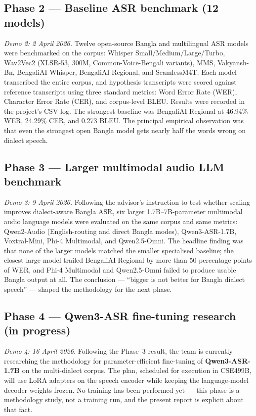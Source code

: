 \documentclass[12pt,a4paper]{article}
\begin{document}
\subsection*{Phase 2 --- Baseline ASR benchmark (12 models)}
\textit{Demo 2: 2 April 2026.}
Twelve open-source Bangla and multilingual ASR models were
benchmarked on the corpus: Whisper Small/Medium/Large/Turbo,
Wav2Vec2 (XLSR-53, 300M, Common-Voice-Bengali variants), MMS,
Vakyansh-Bn, BengaliAI Whisper, BengaliAI Regional, and
SeamlessM4T. Each model transcribed the entire corpus, and
hypothesis transcripts were scored against reference transcripts
using three standard metrics: Word Error Rate (WER), Character
Error Rate (CER), and corpus-level BLEU. Results were recorded in
the project's CSV log. The strongest baseline was BengaliAI
Regional at 46.94\% WER, 24.29\% CER, and 0.273 BLEU. The principal
empirical observation was that even the strongest open Bangla model
gets nearly half the words wrong on dialect speech.

\subsection*{Phase 3 --- Larger multimodal audio LLM benchmark}
\textit{Demo 3: 9 April 2026.}
Following the advisor's instruction to test whether scaling improves
dialect-aware Bangla ASR, six larger 1.7B--7B-parameter multimodal
audio language models were evaluated on the same corpus and same
metrics: Qwen2-Audio (English-routing and direct Bangla modes),
Qwen3-ASR-1.7B, Voxtral-Mini, Phi-4 Multimodal, and Qwen2.5-Omni.
The headline finding was that none of the larger models matched the
smaller specialised baseline; the closest large model trailed
BengaliAI Regional by more than 50 percentage points of WER, and
Phi-4 Multimodal and Qwen2.5-Omni failed to produce usable Bangla
output at all. The conclusion --- ``bigger is not better for Bangla
dialect speech'' --- shaped the methodology for the next phase.

\subsection*{Phase 4 --- Qwen3-ASR fine-tuning research (in progress)}
\textit{Demo 4: 16 April 2026.}
Following the Phase~3 result, the team is currently researching the
methodology for parameter-efficient fine-tuning of
\textbf{Qwen3-ASR-1.7B} on the multi-dialect corpus. The plan,
scheduled for execution in CSE499B, will use LoRA adapters on the
speech encoder while keeping the language-model decoder weights
frozen. No training has been performed yet --- this phase is a
methodology study, not a training run, and the present report is
explicit about that fact.
\end{document}

